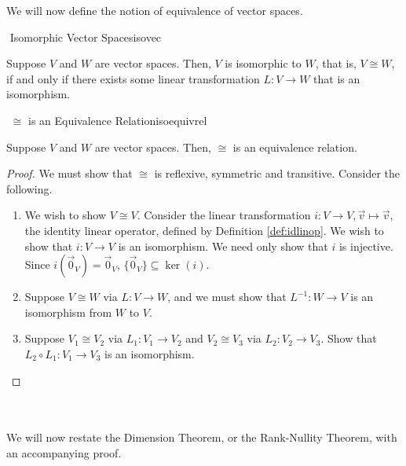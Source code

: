         We will now define the notion of equivalence of vector spaces.
        \begin{definition}{\Stop\,\,Isomorphic Vector Spaces}{isovec}

            Suppose \(V\) and \(W\) are vector spaces. Then, \(V\) is isomorphic to \(W\), that is, \(V\cong W\), if and only if there exists some linear transformation \(L:V\to W\) that is an isomorphism.
            
        \end{definition}
        \begin{theorem}{\Stop\,\,\(\cong\) is an Equivalence Relation}{isoequivrel}

            Suppose \(V\) and \(W\) are vector spaces. Then, \(\cong\) is an equivalence relation.
            \begin{proof}
                We must show that \(\cong\) is reflexive, symmetric and transitive. Consider the following.
                \begin{enumerate}
                    \item We wish to show \(V\cong V\). Consider the linear transformation \(i:V\to V,\vec{v}\mapsto\vec{v}\), the identity linear operator, defined by Definition \ref{def:idlinop}. We wish to show that \(i:V\to V\) is an isomorphism. We need only show that \(i\) is injective. Since \(i(\vec{0}_V)=\vec{0}_V\), \(\{\vec{0}_V\}\subseteq\ker(i)\).
                    \item Suppose \(V\cong W\) via \(L:V\to W\), and we must show that \(L^{-1}:W\to V\) is an isomorphism from \(W\) to \(V\).
                    \item Suppose \(V_1 \cong V_2\) via \(L_1:V_1\to V_2\) and \(V_2\cong V_3\) via \(L_2:V_2\to V_3\). Show that \(L_2\circ L_1:V_1\to V_3\) is an isomorphism.
                \end{enumerate}
                \DOTHISLATER
            \end{proof}

        \end{theorem}
        \pagebreak
        \vphantom
        \\
        \\
        We will now restate the Dimension Theorem, or the Rank-Nullity Theorem, with an accompanying proof.
